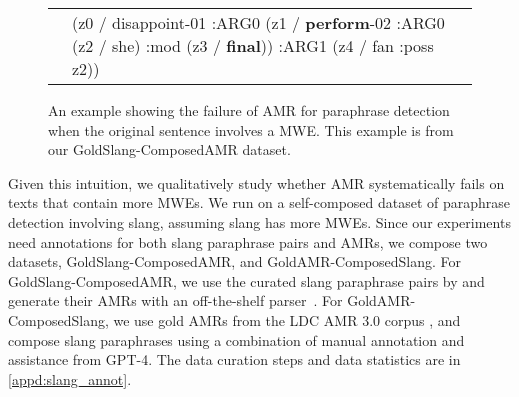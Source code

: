 \begin{figure}[ht]
\begin{tabular}{p{5cm}p{5cm}}
    &
(z0 / disappoint-01\newline
\hspace*{0.3em} :ARG0 (z1 / \textbf{perform}-02\newline
\hspace*{0.3em} \hspace*{0.3em} :ARG0 (z2 / she)\newline
\hspace*{0.3em} \hspace*{0.3em} :mod (z3 / \textbf{final}))\newline
\hspace*{0.3em} :ARG1 (z4 / fan\newline
\hspace*{0.3em} \hspace*{0.3em} :poss z2))
    \end{tabular}
    \caption{
    An example showing the failure of AMR for paraphrase detection when the original sentence involves a MWE. This example is from our GoldSlang-ComposedAMR dataset.
    }
    \vspace{-1em}
    \label{tab:slangeg}
\end{figure}


Given this intuition, we qualitatively study whether AMR systematically fails on texts that contain more MWEs. We run \ourmodel on a self-composed dataset of paraphrase detection involving slang, assuming slang has more MWEs.
Since our experiments need annotations for both slang paraphrase pairs and AMRs, we compose two datasets, GoldSlang-ComposedAMR, and GoldAMR-ComposedSlang.
For GoldSlang-ComposedAMR, we use the curated slang paraphrase pairs by \citet{tayyar2021astitchinlanguagemodels} and generate their AMRs with an off-the-shelf parser~\citep{drozdov2022inducing}.
For GoldAMR-ComposedSlang, we use gold AMRs from the LDC AMR 3.0 corpus \cite{banarescu2013abstract}, and compose slang paraphrases using a combination of manual annotation and assistance from GPT-4. The data curation steps and data statistics are in \cref{appd:slang_annot}.

